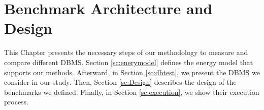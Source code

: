 \chapter{Benchmark Architecture and Design}
\label{cha:middle}



This Chapter presents the necessary steps of our methodology to measure and compare different DBMS. Section \ref{sc:enerymodel} defines the energy model that supports our methods. Afterward, in Section \ref{sc:dbtest}, we present the DBMS we consider in our study.  Then, Section \ref{sc:Design} describes the design of the benchmarks we defined. Finally, in Section \ref{sc:execution}, we show their execution process.







